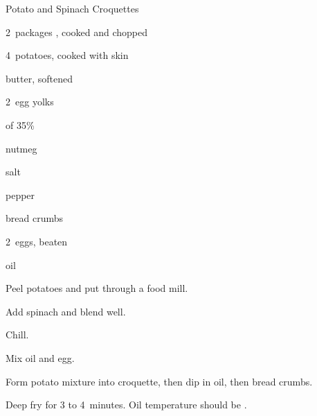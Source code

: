 \begin{recipe}{Potato and Spinach Croquettes}{}{}

\begin{ingredients}
\item 2~packages , cooked and chopped
\item 4~potatoes, cooked with skin
\item {} butter, softened
\item 2~egg yolks
\item {} of 35\% 
\item \tp{\half} nutmeg
\item salt
\item pepper
\item {} bread crumbs
\item 2~eggs, beaten
\item {} oil
\end{ingredients}

\begin{directions}
\item Peel potatoes and put through a food mill.
\item Add spinach and blend well.
\item Chill.
\item Mix oil and egg.
\item Form potato mixture into croquette, then dip in oil, then bread crumbs.
\item Deep fry for 3 to 4~minutes. Oil temperature should be .
\end{directions}

\end{recipe}
